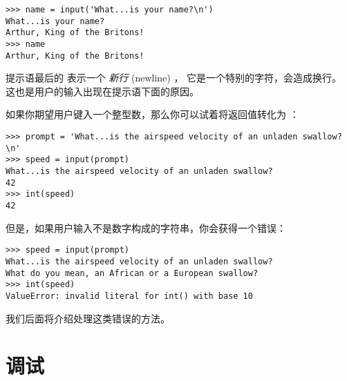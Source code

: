 {{{{\begin{lstlisting}
>>> name = input('What...is your name?\n')
What...is your name?
Arthur, King of the Britons!
>>> name
Arthur, King of the Britons!
\end{lstlisting}

%

提示语最后的 \li{\n} 表示一个 {\em 新行} (newline) ，
它是一个特别的字符，会造成换行。 这也是用户的输入出现在提示语下面的原因。


如果你期望用户键入一个整型数，那么你可以试着将返回值转化为  ：

\begin{lstlisting}
>>> prompt = 'What...is the airspeed velocity of an unladen swallow?\n'
>>> speed = input(prompt)
What...is the airspeed velocity of an unladen swallow?
42
>>> int(speed)
42
\end{lstlisting}

%

但是，如果用户输入不是数字构成的字符串，你会获得一个错误：

\begin{lstlisting}
>>> speed = input(prompt)
What...is the airspeed velocity of an unladen swallow?
What do you mean, an African or a European swallow?
>>> int(speed)
ValueError: invalid literal for int() with base 10
\end{lstlisting}

%

我们后面将介绍处理这类错误的方法。
  


\section{调试}
\label{whitespace}

  
  

}}}}
